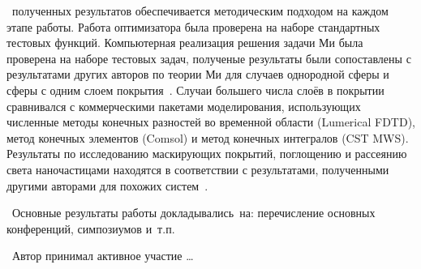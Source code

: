 \reliability\ полученных результатов обеспечивается методическим
подходом на каждом этапе работы. Работа оптимизатора была проверена на
наборе стандартных тестовых функций. Компьютерная реализация решения
задачи Ми была проверена на наборе тестовых задач, полученые
результаты были сопоставлены с результатами других авторов по теории
Ми для случаев однородной сферы и сферы с одним слоем
покрытия~\cite{Suzuki-2013, Bashevoy-2005}.  Случаи большего числа
слоёв в покрытии сравнивался с коммерческими пакетами моделирования,
использующих численные методы конечных разностей во временной области
(Lumerical FDTD), метод конечных элементов (Comsol) и метод конечных
интегралов (CST MWS). Результаты по исследованию маскирующих покрытий,
поглощению и рассеянию света наночастицами находятся в соответствии с
результатами, полученными другими авторами для похожих
систем~\cite{Semouchkina-2013, Alu-2014, Fan-2011}.

\probation\
Основные результаты работы докладывались~на:
перечисление основных конференций, симпозиумов и~т.\:п.

\contribution\ Автор принимал активное участие \ldots

 
    


